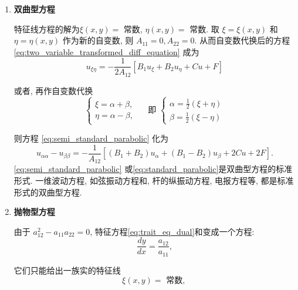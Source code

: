 \begin{enumerate}
    \item \textbf{双曲型方程}
    
    特征线方程的解为$\xi(x, y)=$ 常数, $\eta(x, y)=$ 常数.
    取 $\xi=\xi(x, y)$ 和 $\eta=\eta(x, y)$ 作为新的自变数, 则 $A_{11}=0, A_{22}=0$. 从而自变数代换后的方程\eqref{eq:two_variable_transformed_diff_equation} 成为
    \begin{equation}
        u_{\xi \eta}=-\frac{1}{2 A_{12}}\left[B_1 u_{\xi}+B_2 u_\eta+C u+F\right]
        \label{eq:semi_standard_parabolic}
    \end{equation}

    或者, 再作自变数代换
    $$
    \left\{\begin{array} { l } 
    { \xi = \alpha + \beta , } \\
    { \eta = \alpha - \beta , }
    \end{array} \quad \text { 即 } \left\{\begin{array}{l}
    \alpha=\frac{1}{2}(\xi+\eta) \\
    \beta=\frac{1}{2}(\xi-\eta)
    \end{array}\right.\right.
    $$

    则方程 \eqref{eq:semi_standard_parabolic} 化为
    \begin{equation}
        u_{\alpha \alpha}-u_{\beta \beta}=-\frac{1}{A_{12}}\left[\left(B_1+B_2\right) u_\alpha+\left(B_1-B_2\right) u_\beta+2 C u+2 F\right] .
        \label{eq:standard_parabolic}
    \end{equation}
    \eqref{eq:semi_standard_parabolic} 或\eqref{eq:standard_parabolic}是双曲型方程的标准形式. 
    一维波动方程, 如弦振动方程和, 杆的纵振动方程, 电报方程等, 都是标准形式的双曲型方程.


    \item \textbf{抛物型方程}

    由于 $a_{12}^2-a_{11} a_{22}=0$, 特征方程\eqref{eq:trait_eq_dual}和变成一个方程:
    $$
    \frac{d y}{d x}=\frac{a_{12}}{a_{11}},
    $$

    它们只能给出一族实的特征线
    $$
    \xi(x, y)=\text { 常数, }
    $$


\end{enumerate}
